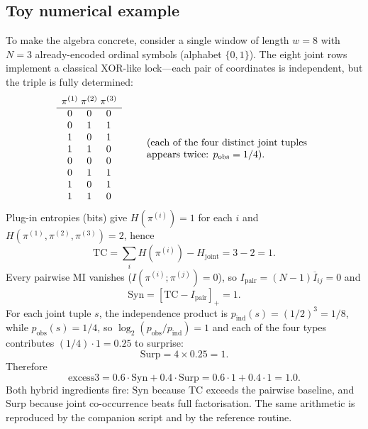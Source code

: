 \documentclass[11pt,a4paper]{article}
\begin{document}
\subsection{Toy numerical example}
\label{sec:toy}

To make the algebra concrete, consider a single window of length $w=8$ with
$N=3$ already-encoded ordinal symbols (alphabet $\{0,1\}$). The eight joint
rows implement a classical XOR-like lock---each pair of coordinates is
independent, but the triple is fully determined:
\begin{equation*}
\begin{array}{c@{\;}c@{\;}c}
\pi^{(1)} & \pi^{(2)} & \pi^{(3)} \\
\hline
0 & 0 & 0 \\
0 & 1 & 1 \\
1 & 0 & 1 \\
1 & 1 & 0 \\
0 & 0 & 0 \\
0 & 1 & 1 \\
1 & 0 & 1 \\
1 & 1 & 0
\end{array}
\qquad
\begin{array}{l}
\text{(each of the four distinct joint tuples}\\
\text{appears twice: }p_{\mathrm{obs}}=1/4\text{).}
\end{array}
\end{equation*}
Plug-in entropies (bits) give $H(\pi^{(i)})=1$ for each $i$ and
$H(\pi^{(1)},\pi^{(2)},\pi^{(3)})=2$, hence
\begin{equation*}
\mathrm{TC}
=\sum_i H(\pi^{(i)})-H_{\mathrm{joint}}
=3-2=1.
\end{equation*}
Every pairwise MI vanishes ($I(\pi^{(i)};\pi^{(j)})=0$), so
$I_{\mathrm{pair}}=(N-1)\overline{I}_{ij}=0$ and
\begin{equation*}
\mathrm{Syn}=[\mathrm{TC}-I_{\mathrm{pair}}]_+=1.
\end{equation*}
For each joint tuple $s$, the independence product is
$p_{\mathrm{ind}}(s)=(1/2)^3=1/8$, while $p_{\mathrm{obs}}(s)=1/4$, so
$\log_2(p_{\mathrm{obs}}/p_{\mathrm{ind}})=1$ and each of the four types
contributes $(1/4)\cdot 1=0.25$ to surprise:
\begin{equation*}
\mathrm{Surp}=4\times 0.25=1.
\end{equation*}
Therefore
\begin{equation*}
\mathrm{excess3}
=0.6\cdot\mathrm{Syn}+0.4\cdot\mathrm{Surp}
=0.6\cdot 1+0.4\cdot 1=1.0.
\end{equation*}
Both hybrid ingredients fire: $\mathrm{Syn}$ because TC exceeds the
pairwise baseline, and $\mathrm{Surp}$ because joint co-occurrence beats
full factorisation. The same arithmetic is reproduced by the companion
script  and by the reference
 routine.
\end{document}
